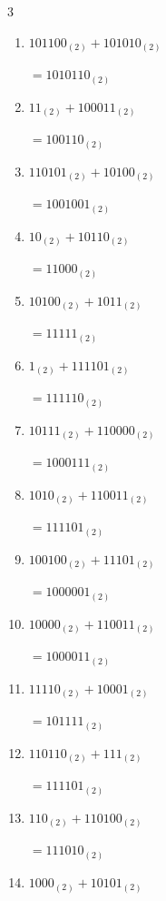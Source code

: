\begin{multicols}{3}
\begin{enumerate}
\columnbreak %

  \item $101100_{(2)} + 101010_{(2)}$

        $=1010110_{(2)}$

  \item $11_{(2)} + 100011_{(2)}$

        $=100110_{(2)}$

  \item $110101_{(2)} + 10100_{(2)}$

        $=1001001_{(2)}$

  \item $10_{(2)} + 10110_{(2)}$

        $=11000_{(2)}$

  \item $10100_{(2)} + 1011_{(2)}$

        $=11111_{(2)}$

  \item $1_{(2)} + 111101_{(2)}$

        $=111110_{(2)}$

  \item $10111_{(2)} + 110000_{(2)}$

        $=1000111_{(2)}$

  \item $1010_{(2)} + 110011_{(2)}$

        $=111101_{(2)}$

  \item $100100_{(2)} + 11101_{(2)}$

        $=1000001_{(2)}$

  \item $10000_{(2)} + 110011_{(2)}$

        $=1000011_{(2)}$

\columnbreak %

  \item $11110_{(2)} + 10001_{(2)}$

        $=101111_{(2)}$

  \item $110110_{(2)} + 111_{(2)}$

        $=111101_{(2)}$

  \item $110_{(2)} + 110100_{(2)}$

        $=111010_{(2)}$

  \item $1000_{(2)} + 10101_{(2)}$


\end{enumerate}
\end{multicols}
